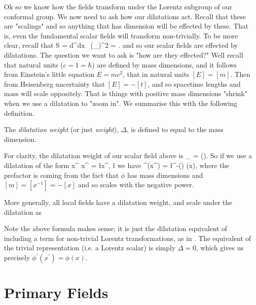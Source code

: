 Ok so we know how the fields transform under the Lorentz subgroup of our conformal group. We now need to ask how our dilatations act. Recall that these are "scalings" and so anything that has dimension will be effected by these. That is, even the fundamental scalar fields will transform non-trivially. To be more clear, recall that 
\bse 
    S = \int d^dx  \, (\p_{\mu}\phi)^2 \qquad \implies \qquad [\phi] = .
\ese
and so our scalar fields are effected by dilatations. The question we want to ask is "how are they effected?" Well recall that natural units ($c=1=\hbar$) are defined by mass dimensions, and it follows from Einstein's little equation $E=mc^2$, that in natural units $[E]=[m]$. Then from Heisenberg uncertainty that $[E] = -[t]$, and so spacetime lengths and mass will scale oppositely. That is things with positive mass dimensions "shrink" when we use a dilatation to "zoom in". We summarise this with the following definition. 

    The \textit{dilatation weight} (or just \textit{weight}), $\Delta$, is defined to equal to the mass dimension. 
\ed 

For clarity, the dilatation weight of our scalar field above is 
\bse 
    \Delta_{\phi} = \bigg(\bigg).
\ese 
So if we use a dilatation of the form 
\be 
\label{eqn:xDilatation}
    x^{\mu} \to x^{\prime\mu} = \l x^{\mu}, \qquad \l\in \R 
\ee 
we have 
\be
\label{eqn:phiDilatation}
    \phi^{\prime}(x^{\prime}) = \l^{-\big(\big)} \phi(x),
\ee
where the prefactor is coming from the fact that $\phi$ has mass dimensions and $[m] = [x^{-1}] = -[x]$ and so scales with the negative power.

More generally, all local fields have a dilatation weight, and scale under the dilatation  as

\badr 
    Note the above formula makes sense; it is just the dilatation equivalent of including a term for non-trivial Lorentz transformations, as in . The equivalent of the trivial representation (i.e. a Lorentz scalar) is simply $\Delta=0$, which gives us precisely $\phi^{\prime}(x^{\prime})=\phi(x)$. %
\eadr 

\section{Primary Fields}

